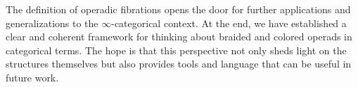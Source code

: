 \medskip
The definition of operadic fibrations opens the door for further applications
and generalizations to the $\infty$-categorical context. At the end, we
have established
 a clear and coherent framework for thinking about braided and
colored operads in categorical terms. The hope is that this perspective not only
sheds light on the structures themselves but also provides tools and language
that can be useful in future work.
